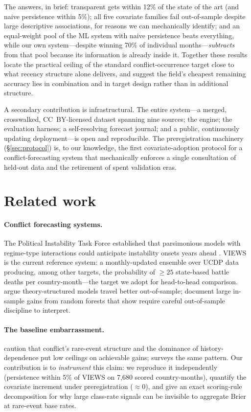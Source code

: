 \documentclass[11pt]{article}
\begin{document}
The answers, in brief: transparent gets within 12\% of the state of the art
(and naive persistence within 5\%); all five covariate families fail
out-of-sample despite large descriptive associations, for reasons we can
mechanically identify; and an equal-weight pool of the ML system with naive
persistence beats everything, while our own system---despite winning 70\% of
individual months---\emph{subtracts} from that pool because its information
is already inside it. Together these results locate the practical ceiling of
the standard conflict-occurrence target close to what recency structure alone
delivers, and suggest the field's cheapest remaining accuracy lies in
combination and in target design rather than in additional structure.

A secondary contribution is infrastructural. The entire system---a merged,
crosswalked, CC~BY-licensed dataset spanning nine sources; the engine; the
evaluation harness; a self-resolving forecast journal; and a public,
continuously updating deployment---is open and reproducible. The
preregistration machinery (\S\ref{sec:protocol}) is, to our knowledge, the
first covariate-adoption protocol for a conflict-forecasting system that
mechanically enforces a single consultation of held-out data and the
retirement of spent validation eras.

\section{Related work}\label{sec:related}

\paragraph{Conflict forecasting systems.} The Political Instability Task
Force established that parsimonious models with regime-type interactions
could anticipate instability onsets years ahead \citep{goldstone2010global}.
VIEWS \citep{hegre2019views,hegre2022lessons} is the current reference
system: a monthly-updated ensemble over UCDP data producing, among other
targets, the probability of ${\geq}25$ state-based battle deaths per
country-month---the target we adopt for head-to-head comparison.
\citet{blair2020forecasting} argue theory-structured models travel better
out-of-sample; \citet{muchlinski2016comparing} document large in-sample gains
from random forests that \citet{colaresi2017robot} show require careful
out-of-sample discipline to interpret.

\paragraph{The baseline embarrassment.} \citet{cederman2017predicting}
caution that conflict's rare-event structure and the dominance of
history-dependence put low ceilings on achievable gains;
\citet{chadefaux2017limits} surveys the same pattern. Our contribution is to
\emph{instrument} this claim: we reproduce it independently (persistence
within 5\% of VIEWS on 7{,}680 scored country-months), quantify the covariate
increment under preregistration ($\approx 0$), and give an exact scoring-rule
decomposition for why large class-rate signals can be invisible to aggregate
Brier at rare-event base rates.
\end{document}
